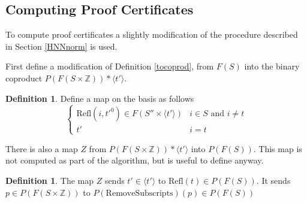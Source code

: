 \documentclass[11pt]{article} %
\theoremstyle{definition}
\theoremstyle{definition}
\theoremstyle{definition}
\theoremstyle{definition}
\theoremstyle{definition}
\newtheorem{defn}[theorem]{Definition}
\theoremstyle{definition}
\begin{document}

\subsection{Computing Proof Certificates}\label{HNNPC}

To compute proof certificates a slightly modification of the procedure described in Section
\ref{HNNnorm} is used.

First define a modification of Definition \ref{tocoprod}, from $F(S)$ into the binary
coproduct $P(F(S \times \mathbb{Z})) \ast \langle t' \rangle$.

\begin{defn}\label{tocoprodP}
  Define a map on the basis as follows
  \begin{equation}
    \begin{cases}
      \text{Refl}(i, t'^0) \in F(S'' \times \langle t' \rangle) & i \in S \text{ and } i \ne t \\
      t' & i = t
    \end{cases}
  \end{equation}
\end{defn}

There is also a map $Z$ from $P(F(S \times \mathbb{Z})) \ast \langle t' \rangle$ into
$P(F(S))$. This map is not computed as part of the algorithm, but is useful to define anyway.

\begin{defn}
  The map $Z$ sends $t' \in \langle t' \rangle$ to $\text{Refl}(t) \in P(F(S))$.
  It sends $p \in P(F(S \times \mathbb{Z}))$ to $P(\text{RemoveSubscripts})(p) \in P(F(S))$
\end{defn}
\end{document}
